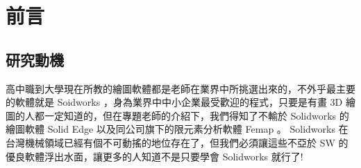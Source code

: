 \chapter{前言}
\renewcommand{\baselinestretch}{10.0} %
\setcounter{page}{1}  %
\fontsize{14pt}{2.5pt}\sectionef
\section{研究動機}
高中職到大學現在所教的繪圖軟體都是老師在業界中所挑選出來的，不外乎最主要的軟體就是 Soidworks ，身為業界中中小企業最受歡迎的程式，只要是有畫 3D 繪圖的人都一定知道的，但在專題老師的介紹下，我們得知了不輸於 Solidworks 的繪圖軟體 Solid Edge 以及同公司旗下的限元素分析軟體 Femap 。 Solidworks 在台灣機械領域已經有個不可動搖的地位存在了，但我們必須讓這些不亞於 SW 的優良軟體浮出水面，讓更多的人知道不是只要學會 Solidworks 就行了!\\[8pt]

